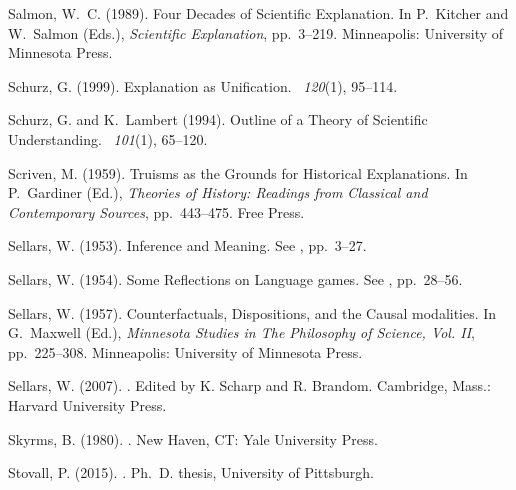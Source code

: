 \documentclass[natbib]{svjour3}                     %
\begin{document}
\begin{thebibliography}{19}
Salmon, W.~C. (1989).
\newblock Four Decades of Scientific Explanation.
\newblock In P.~Kitcher and W.~Salmon (Eds.), {\em Scientific Explanation},
  pp.\  3--219. Minneapolis: University of Minnesota Press.

Schurz, G. (1999).
\newblock Explanation as Unification.
~{\em 120\/}(1), 95--114.

Schurz, G. and K.~Lambert (1994).
\newblock Outline of a Theory of Scientific Understanding.
~{\em 101\/}(1), 65--120.

Scriven, M. (1959).
\newblock Truisms as the Grounds for Historical Explanations.
\newblock In P.~Gardiner (Ed.), {\em Theories of History: Readings from
	Classical and Contemporary Sources}, pp.\  443--475. Free Press.

Sellars, W. (1953).
\newblock Inference and Meaning.
\newblock See , pp.\  3--27.

Sellars, W. (1954).
\newblock Some Reflections on Language games.
\newblock See , pp.\  28--56.

Sellars, W. (1957).
\newblock Counterfactuals, Dispositions, and the Causal modalities.
\newblock In G.~Maxwell (Ed.), {\em Minnesota Studies in The Philosophy of
  Science, Vol. II}, pp.\  225--308. Minneapolis: University of Minnesota Press.

Sellars, W. (2007).
.
\newblock Edited by K. Scharp and R. Brandom.
\newblock Cambridge, Mass.: Harvard University Press.

Skyrms, B. (1980).
.
\newblock New Haven, CT: Yale University Press.

Stovall, P. (2015).
.
\newblock Ph.\ D. thesis, University of Pittsburgh.


\end{thebibliography}
\end{document}
